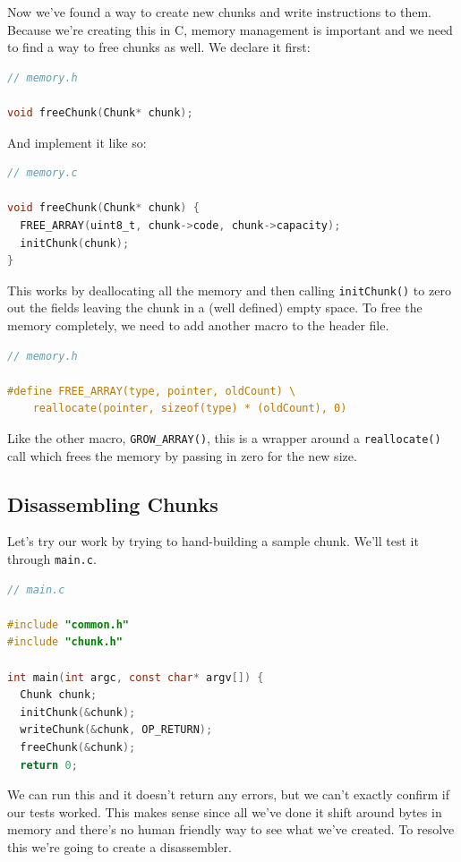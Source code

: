 Now we've found a way to create new chunks and write instructions to them. Because we're creating this in C, memory management is important and we need to find a way to free chunks as well. We declare it first:

\begin{lstlisting}[language=C]
// memory.h

void freeChunk(Chunk* chunk);
\end{lstlisting}

And implement it like so:

\begin{lstlisting}[language=C]
// memory.c

void freeChunk(Chunk* chunk) {
  FREE_ARRAY(uint8_t, chunk->code, chunk->capacity);
  initChunk(chunk);
}
\end{lstlisting}

This works by deallocating all the memory and then calling \verb/initChunk()/ to zero out the fields leaving the chunk in a (well defined) empty space. To free the memory completely, we need to add another macro to the header file.

\begin{lstlisting}[language=C]
// memory.h

#define FREE_ARRAY(type, pointer, oldCount) \
    reallocate(pointer, sizeof(type) * (oldCount), 0)
\end{lstlisting}

Like the other macro, \verb>GROW_ARRAY()>, this is a wrapper around a \verb.reallocate(). call which frees the memory by passing in zero for the new size.

\subsection{Disassembling Chunks}

Let's try our work by trying to hand-building a sample chunk. We'll test it through \verb,main.c,. 

\begin{lstlisting}[language=C]
// main.c

#include "common.h"
#include "chunk.h"

int main(int argc, const char* argv[]) {
  Chunk chunk;
  initChunk(&chunk);
  writeChunk(&chunk, OP_RETURN);
  freeChunk(&chunk);
  return 0;
\end{lstlisting}

We can run this and it doesn't return any errors, but we can't exactly confirm if our tests worked. This makes sense since all we've done it shift around bytes in memory and there's no human friendly way to see what we've created. To resolve this we're going to create a disassembler.

